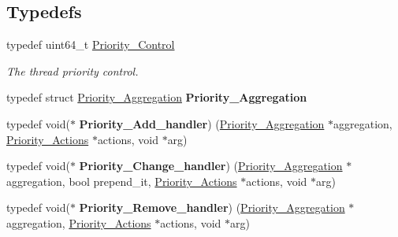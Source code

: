 \subsection*{Typedefs}
\begin{DoxyCompactItemize}
\item 
typedef uint64\+\_\+t \mbox{\hyperlink{group__RTEMSScorePriority_ga59d02b58072d31a9a1cfe644557aefe2}{Priority\+\_\+\+Control}}
\begin{DoxyCompactList}\small\item\em The thread priority control. \end{DoxyCompactList}\item 
\mbox{\label{group__RTEMSScorePriority_gae30d9a22259203f453e5165b97fdf471}} 
typedef struct \mbox{\hyperlink{structPriority__Aggregation}{Priority\+\_\+\+Aggregation}} {\bfseries Priority\+\_\+\+Aggregation}
\item 
\mbox{\label{group__RTEMSScorePriority_ga28d1b10b7655f7c4353ee4db20f90bdf}} 
typedef void($\ast$ {\bfseries Priority\+\_\+\+Add\+\_\+handler}) (\mbox{\hyperlink{structPriority__Aggregation}{Priority\+\_\+\+Aggregation}} $\ast$aggregation, \mbox{\hyperlink{structPriority__Actions}{Priority\+\_\+\+Actions}} $\ast$actions, void $\ast$arg)
\item 
\mbox{\label{group__RTEMSScorePriority_gaac6dfb6e12d51323dd149dbb405e15c9}} 
typedef void($\ast$ {\bfseries Priority\+\_\+\+Change\+\_\+handler}) (\mbox{\hyperlink{structPriority__Aggregation}{Priority\+\_\+\+Aggregation}} $\ast$aggregation, bool prepend\+\_\+it, \mbox{\hyperlink{structPriority__Actions}{Priority\+\_\+\+Actions}} $\ast$actions, void $\ast$arg)
\item 
\mbox{\label{group__RTEMSScorePriority_gac50c2321303f6712b46433ac2477c5f6}} 
typedef void($\ast$ {\bfseries Priority\+\_\+\+Remove\+\_\+handler}) (\mbox{\hyperlink{structPriority__Aggregation}{Priority\+\_\+\+Aggregation}} $\ast$aggregation, \mbox{\hyperlink{structPriority__Actions}{Priority\+\_\+\+Actions}} $\ast$actions, void $\ast$arg)
\end{DoxyCompactItemize}
